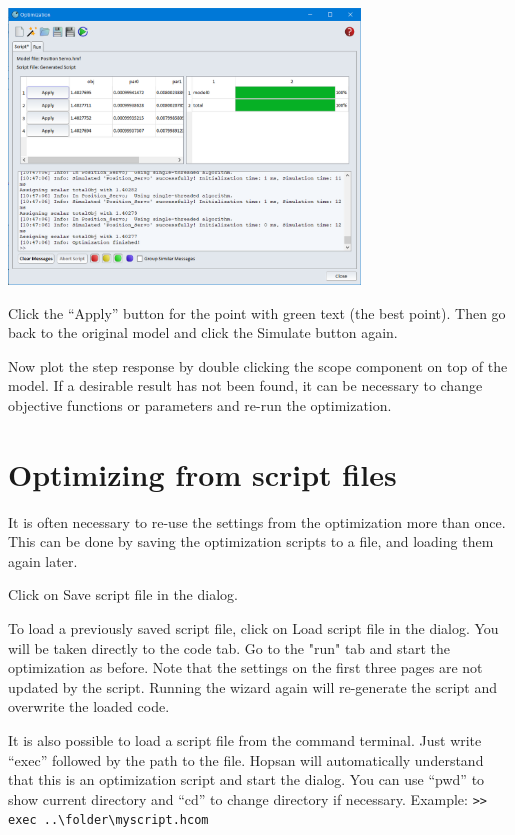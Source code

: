 \documentclass[a4paper,pdftex]{article}
\begin{document}
\begin{tutenumerate}
\begin{center}
\includegraphics[width=0.7\textwidth]{gfx/optimization/screenshot-opt5c.png}
\end{center}

Click the \enquote{Apply} button for the point with green text (the best point). Then go back to the original model and click the Simulate button again.


Now plot the step response by double clicking the scope component on top of the model. If a desirable result has not been found, it can be necessary to change objective functions or parameters and re-run the optimization.

\end{tutenumerate}

\section*{Optimizing from script files}
It is often necessary to re-use the settings from the optimization more than once. This can be done by saving the optimization scripts to a file, and loading them again later.

\begin{tutenumerate}
\vspace{-\baselineskip}

Click on Save script file in the dialog.

To load a previously saved script file, click on Load script file in the dialog. You will be taken directly to the code tab. Go to the "run" tab and start the optimization as before. Note that the settings on the first three pages are not updated by the script. Running the wizard again will re-generate the script and overwrite the loaded code.

It is also possible to load a script file from the command terminal. Just write \enquote{exec} followed by the path to the file. Hopsan will automatically understand that this is an optimization script and start the dialog. You can use \enquote{pwd} to show current directory and \enquote{cd} to change directory if necessary. Example: \texttt{>{}> exec ..\textbackslash folder\textbackslash myscript.hcom}

\end{tutenumerate}
\end{document}
